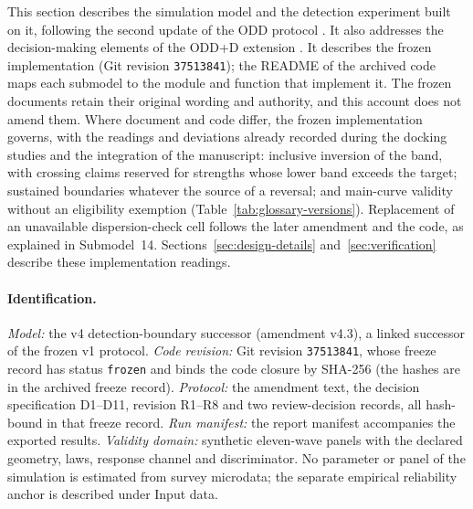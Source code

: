 
This section describes the simulation model and the detection experiment built on it, following the second update of the ODD protocol \cite{grimm2020odd}. It also addresses the decision-making elements of the ODD+D extension \cite{muller2013oddd}. %
It describes the frozen implementation (Git revision \texttt{37513841}); the README of the archived code maps each submodel to the module and function that implement it. The frozen documents retain their original wording and authority, and this account does not amend them. Where document and code differ, the frozen implementation governs, with the readings and deviations already recorded during the docking studies and the integration of the manuscript: inclusive inversion of the band, with crossing claims reserved for strengths whose lower band exceeds the target; sustained boundaries whatever the source of a reversal; and main-curve validity without an eligibility exemption (Table~\ref{tab:glossary-versions}). Replacement of an unavailable dispersion-check cell follows the later amendment and the code, as explained in Submodel~14. Sections~\ref{sec:design-details} and~\ref{sec:verification} describe these implementation readings. %

\paragraph{Identification.}
\emph{Model:} the v4 detection-boundary successor (amendment v4.3), a linked successor of the frozen v1 protocol. \emph{Code revision:} Git revision \texttt{37513841}, whose freeze record has status \texttt{frozen} and binds the code closure by SHA-256 (the hashes are in the archived freeze record). \emph{Protocol:} the amendment text, the decision specification D1--D11, revision R1--R8 and two review-decision records, all hash-bound in that freeze record. \emph{Run manifest:} the report manifest accompanies the exported results. \emph{Validity domain:} synthetic eleven-wave panels with the declared geometry, laws, response channel and discriminator. No parameter or panel of the simulation is estimated from survey microdata; the separate empirical reliability anchor is described under Input data.

